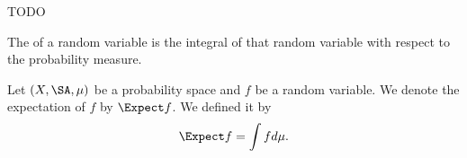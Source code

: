 
\sbasic



\sstart



TODO


The 
of a random variable
is the integral of that
random variable with
respect to the probability
measure.


Let $(X, \SA, \mu)$
be a probability space
and $f$ be a random variable.
We denote the expectation
of $f$ by $\Expect f$.
We defined it by
\[
  \Expect f = \int f d\mu.
\]


\strats
